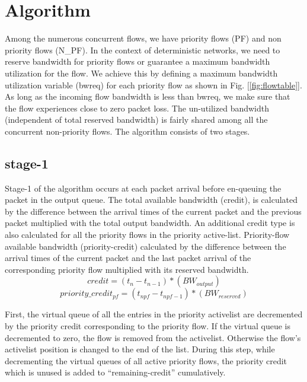 \documentclass[10pt,sigconf,letterpaper,anonymous]{acmart}
\begin{document}
\section{Algorithm}

Among the numerous concurrent flows, we have priority flows (PF) and non priority flows (N\_PF). In the context of deterministic networks, we need to reserve bandwidth for priority flows or guarantee a maximum bandwidth utilization for the flow. We achieve this by defining a maximum bandwidth utilization variable (bwreq) for each priority flow as shown in Fig. [\ref{fig:flowtable}]. As long as the incoming flow bandwidth is less than bwreq, we make sure that the flow experiences close to zero packet loss. The un-utilized bandwidth (independent of total reserved bandwidth) is fairly shared among all the concurrent non-priority flows. The algorithm consists of two stages.

\subsection {stage-1}
Stage-1 of the algorithm occurs at each packet arrival before en-queuing the packet in the output queue. The total available bandwidth (credit), is calculated by the difference between the arrival times of the current packet and the previous packet multiplied with the total output bandwidth. An additional credit type is also calculated for all the priority flows in the priority active-list. Priority-flow available bandwidth (priority-credit) calculated by the difference between the arrival times of the current packet and the last packet arrival of the corresponding priority flow multiplied with its reserved bandwidth. 
\begin{equation}
credit=(t_n - t_{n-1})*(BW_{output})\label{credit}
\end{equation}
\begin{equation}
priority\_credit_{pf}=(t_{npf}-t_{npf-1})*(BW_{reserved})\label{prioritycredit}
\end{equation}

First, the virtual queue of all the entries in the priority activelist are decremented by the priority credit corresponding to the priority flow. If the virtual queue is decremented to zero, the flow is removed from the activelist. Otherwise the flow's activelist position is changed to the end of the list. During this step, while decrementing the virtual queues of all active priority flows, the priority credit which is unused is added to ``remaining-credit'' cumulatively.
\end{document}
